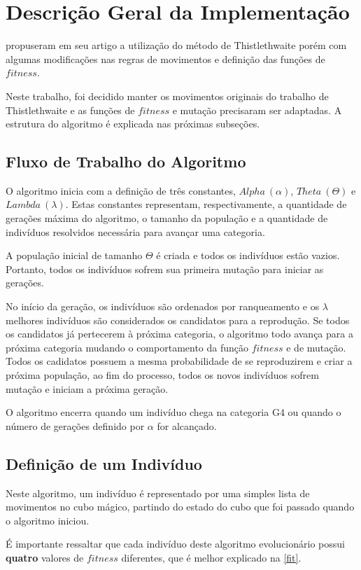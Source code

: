 \documentclass[12pt]{article}
\begin{document}
\section{Descrição Geral da Implementação}
  \cite{thistlethwaiteES} propuseram em seu artigo a utilização do método de Thistlethwaite porém com algumas modificações nas regras de movimentos e definição das funções de $fitness$.

  Neste trabalho, foi decidido manter os movimentos originais do trabalho de Thistlethwaite e as funções de $fitness$ e mutação precisaram ser adaptadas. A estrutura do algoritmo é explicada nas próximas subseções.

  \subsection{Fluxo de Trabalho do Algoritmo}
    O algoritmo inicia com a definição de três constantes, $Alpha\ (\alpha)$, $Theta\ (\Theta)$ e $Lambda\ (\lambda)$. Estas constantes representam, respectivamente, a quantidade de gerações máxima do algoritmo, o tamanho da população e a quantidade de indivíduos resolvidos necessária para avançar uma categoria.

    A população inicial de tamanho $\Theta$ é criada e todos os indivíduos estão vazios. Portanto, todos os indivíduos sofrem sua primeira mutação para iniciar as gerações.

    No início da geração, os indivíduos são ordenados por ranqueamento e os $\lambda$ melhores indivíduos são considerados os candidatos para a reprodução. Se todos os candidatos já pertecerem à próxima categoria, o algoritmo todo avança para a próxima categoria mudando o comportamento da função $fitness$ e de mutação. Todos os cadidatos possuem a mesma probabilidade de se reproduzirem e criar a próxima população, ao fim do processo, todos os novos indivíduos sofrem mutação e iniciam a próxima geração.

    O algoritmo encerra quando um indivíduo chega na categoria G4 ou quando o número de gerações definido por $\alpha$ for alcançado.

  \subsection{Definição de um Indivíduo}
    Neste algoritmo, um indivíduo é representado por uma simples lista de movimentos no cubo mágico, partindo do estado do cubo que foi passado quando o algoritmo iniciou.

    É importante ressaltar que cada indivíduo deste algoritmo evolucionário possui \textbf{quatro} valores de $fitness$ diferentes, que é melhor explicado na \autoref{fit}.
 
\end{document}
